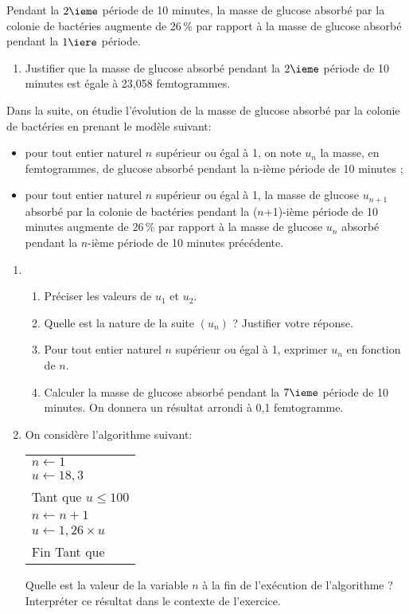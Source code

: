 \documentclass[10pt,a4paper,french]{article}
\begin{document}
Pendant la $2\ieme$ période de 10 minutes, la masse de glucose absorbé par la colonie de bactéries
augmente de 26\,\% par rapport à la masse de glucose absorbé pendant la $1\iere$ période.
\begin{enumerate}
\item  Justifier que la masse de glucose absorbé pendant la $2\ieme$ période de 10 minutes est égale à
23,058 femtogrammes.
\end{enumerate}
Dans la suite, on étudie l'évolution de la masse de glucose absorbé par la colonie de bactéries en
prenant le modèle suivant:
\begin{itemize}
\item  pour tout entier naturel $n$ supérieur ou égal à 1, on note $u_n$ la masse, en femtogrammes, de
glucose absorbé pendant la n-ième période de 10 minutes ;
\item pour tout entier naturel $n$ supérieur ou égal à 1, la masse de glucose $u_{n+1}$ absorbé par la
colonie de bactéries pendant la ($n$+1)-ième période de 10 minutes augmente de 26\,\% par
rapport à la masse de glucose $u_n$ absorbé pendant la $n$-ième période de 10 minutes précédente.
\end{itemize}
\begin{enumerate}[resume]
\item 
\begin{enumerate}
\item Préciser les valeurs de $u_1$ et $u_2$.
\item Quelle est la nature de la suite $\left(u_n\right)$ ? Justifier votre réponse.
\item Pour tout entier naturel $n$ supérieur ou égal à 1, exprimer $u_n$ en fonction de $n$.
\item Calculer la masse de glucose absorbé pendant la $7\ieme$ période de 10 minutes. On donnera un
résultat arrondi à 0,1 femtogramme.
\end{enumerate}
\item On considère l'algorithme suivant:

\medskip
\begin{center}



\begin{tabular}[]{|l|}
\hline
$n\longleftarrow  1$\\
$u \longleftarrow  18,3$\\
Tant que $u \leqslant 100$\\
\hspace{2em}$n\longleftarrow n+1$\\
\hspace{2em}$u \longleftarrow 1,26\times u$\\
Fin Tant que\\
\hline
\end{tabular}
\end{center}

\medskip

Quelle est la valeur de la variable $n$ à la fin de l'exécution de l'algorithme ? Interpréter ce résultat
dans le contexte de l'exercice.
\end{enumerate}
\end{document}
